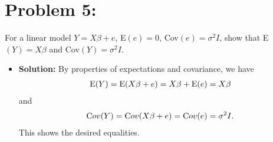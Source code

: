 \documentclass[11pt]{article}
\newcommand{\E}{{\text E}}
\newcommand{\C}{{\text Cov}}
\begin{document}
\section*{Problem 5:}
For a linear model $Y=X\beta + e$, E$(e) = 0$, Cov$(e) = \sigma^2I$, show that E$(Y) = X\beta$ and Cov$(Y) = \sigma^2I$.
\begin{itemize}
\item[] {\bf Solution:}  By properties of expectations and covariance, we have
\begin{align*}
\E(Y) = \E(X\beta + e) = X\beta + \E(e) = X\beta
\end{align*}
and
\begin{align*}
\C(Y) = \C(X\beta + e) = \C(e) = \sigma^2I.
\end{align*}
This shows the desired equalities.
\end{itemize}
\newpage
\end{document}
